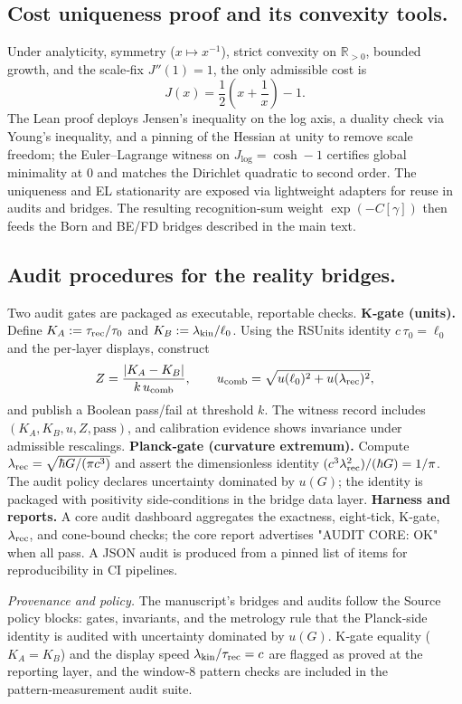 \documentclass[12pt,a4paper]{article}
\theoremstyle{definition}
\theoremstyle{remark}
\begin{document}
\subsection{Cost uniqueness proof and its convexity tools.}
Under analyticity, symmetry (\(x\mapsto x^{-1}\)), strict convexity on \(\mathbb{R}_{>0}\), bounded growth, and the scale‑fix \(J''(1)=1\), the only admissible cost is 
\[
J(x)=\frac12\!\left(x+\frac{1}{x}\right)-1.
\]
The Lean proof deploys Jensen's inequality on the log axis, a duality check via Young's inequality, and a pinning of the Hessian at unity to remove scale freedom; the Euler–Lagrange witness on \(J_{\log}=\cosh-1\) certifies global minimality at \(0\) and matches the Dirichlet quadratic to second order. The uniqueness and EL stationarity are exposed via lightweight adapters for reuse in audits and bridges. The resulting recognition‑sum weight \(\exp(-C[\gamma])\) then feeds the Born and BE/FD bridges described in the main text. 

\subsection{Audit procedures for the reality bridges.}
Two audit gates are packaged as executable, reportable checks.  
\textbf{K‑gate (units).} Define \(K_A:=\tau_{\rm rec}/\tau_0\) and \(K_B:=\lambda_{\rm kin}/\ell_0\). Using the RSUnits identity \(c\,\tau_0=\ell_0\) and the per‑layer displays, construct 
\[
Z=\frac{|K_A-K_B|}{k\,u_{\rm comb}},\qquad u_{\rm comb}=\sqrt{u(\ell_0)^2+u(\lambda_{\rm rec})^2},
\]
and publish a Boolean pass/fail at threshold \(k\). The witness record includes \((K_A,K_B,u,Z,\mathrm{pass})\), and calibration evidence shows invariance under admissible rescalings.  
\textbf{Planck‑gate (curvature extremum).} Compute \(\lambda_{\rm rec}=\sqrt{\hbar G/(\pi c^3)}\) and assert the dimensionless identity \((c^3\lambda_{\rm rec}^2)/(\hbar G)=1/\pi\). The audit policy declares uncertainty dominated by \(u(G)\); the identity is packaged with positivity side‑conditions in the bridge data layer.  
\textbf{Harness and reports.} A core audit dashboard aggregates the exactness, eight‑tick, K‑gate, \(\lambda_{\rm rec}\), and cone‑bound checks; the core report advertises "AUDIT CORE: OK" when all pass. A JSON audit is produced from a pinned list of items for reproducibility in CI pipelines.  

\medskip
\noindent\emph{Provenance and policy.} The manuscript's bridges and audits follow the Source policy blocks: gates, invariants, and the metrology rule that the Planck‑side identity is audited with uncertainty dominated by \(u(G)\). K‑gate equality (\(K_A=K_B\)) and the display speed \(\lambda_{\rm kin}/\tau_{\rm rec}=c\) are flagged as proved at the reporting layer, and the window‑8 pattern checks are included in the pattern‑measurement audit suite. 
\end{document}
